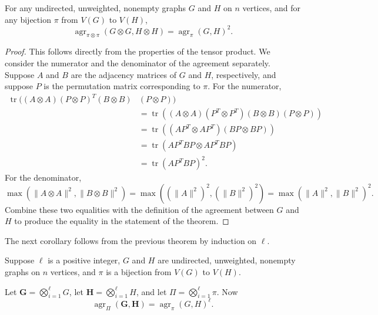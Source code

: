 \documentclass{article}
\newcommand{\1}{\mathbf{1}}
\DeclareMathOperator{\tr}{tr}
\DeclareMathOperator{\agr}{agr}
\begin{document}
\begin{theorem}
  For any undirected, unweighted, nonempty graphs $G$ and $H$ on $n$ vertices, and for any bijection $\pi$ from $V(G)$ to $V(H)$,
  \begin{equation*}
    \agr_{\pi \otimes \pi}(G \otimes G, H \otimes H) = \agr_\pi(G, H)^2.
  \end{equation*}
\end{theorem}
\begin{proof}
  This follows directly from the properties of the tensor product.
  We consider the numerator and the denominator of the agreement separately.
  Suppose $A$ and $B$ are the adjacency matrices of $G$ and $H$, respectively, and suppose $P$ is the permutation matrix corresponding to $\pi$.
  For the numerator,
  \begin{align*}
    \tr((A \otimes A)(P \otimes P)^T(B \otimes B) & (P \otimes P)) \\
    & = \tr((A \otimes A)(P^T \otimes P^T)(B \otimes B)(P \otimes P)) \\
    & = \tr((AP^T \otimes AP^T)(BP \otimes BP)) \\
    & = \tr(AP^TBP \otimes AP^TBP) \\
    & = \tr(AP^TBP)^2.
  \end{align*}
  For the denominator,
  \begin{equation*}
    \max(\|A \otimes A\|^2, \|B \otimes B\|^2) = \max((\|A\|^2)^2, (\|B\|^2)^2) = \max(\|A\|^2, \|B\|^2)^2.
  \end{equation*}
  Combine these two equalities with the definition of the agreement between $G$ and $H$ to produce the equality in the statement of the theorem.
\end{proof}

The next corollary follows from the previous theorem by induction on $\ell$.

\begin{corollary}
  Suppose $\ell$ is a positive integer, $G$ and $H$ are undirected, unweighted, nonempty graphs on $n$ vertices, and $\pi$ is a bijection from $V(G)$ to $V(H)$.

  Let $\mathbf{G} = \bigotimes_{i = 1}^\ell G$, let $\mathbf{H} = \bigotimes_{i = 1}^\ell H$, and let $\Pi = \bigotimes_{i = 1}^\ell \pi$.
  Now
  \begin{equation*}
    \agr_{\Pi}(\mathbf{G}, \mathbf{H}) = \agr_\pi(G, H)^\ell.
  \end{equation*}
\end{corollary}
\end{document}

